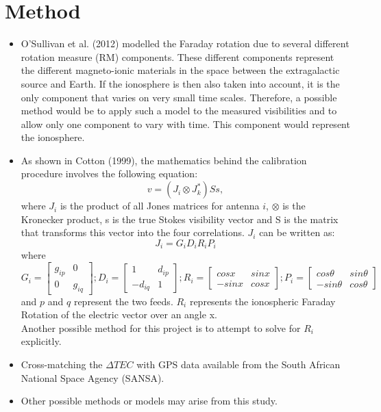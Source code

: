 \documentclass[a4paper,12pt,notitlepage]{article}
\begin{document}
\section{Method}

\begin{itemize}
\item O'Sullivan et al. (2012) modelled the Faraday rotation due to several different rotation measure (RM) components. These different components represent the different magneto-ionic materials in the space between the extragalactic source and Earth. If the ionosphere is then also taken into account, it is the only component that varies on very small time scales. Therefore, a possible method would be to apply such a model to the measured visibilities and to allow only one component to vary with time. This component would represent the ionosphere.

\item As shown in Cotton (1999), the mathematics behind the calibration procedure involves the following equation:
\begin{equation}
v = (J_i \otimes J_k ^*)Ss ,
\end{equation}
where $J_i$ is the product of all Jones matrices for antenna $i$, $\otimes$ is the Kronecker product, s is the true Stokes visibility vector and S is the matrix that transforms this vector into the four correlations. $J_i$ can be written as:
\begin{equation}
J_i =G_i D_i R_i P_i
\end{equation}
where
\begin{equation}
G_i = \left[ \begin{array}{cc}
			g_{ip} & 0 \\
			0 & g_{iq} \end{array} \right];
D_i= \left[ \begin{array}{cc}
			1 & d_{ip} \\
			-d_{iq} & 1 \end{array} \right];
R_i= \left[ \begin{array}{cc}
			cosx & sinx \\
			-sinx & cosx \end{array} \right];
P_i= \left[ \begin{array}{cc}
			cos\theta & sin\theta \\
			-sin\theta & cos\theta \end{array} \right]
\end{equation}
and $p$ and $q$ represent the two feeds. $R_i$ represents the ionospheric Faraday Rotation of the electric vector over an angle x.\\

Another possible method for this project is to attempt to solve for $R_i$ explicitly.

\item Cross-matching the $\Delta TEC$ with GPS data available from the South African National Space Agency (SANSA).

\item Other possible methods or models may arise from this study.
\end{itemize}
\end{document}
